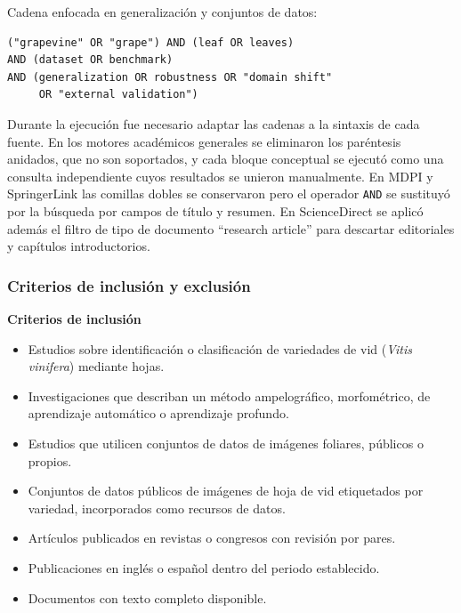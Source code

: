 Cadena enfocada en generalización y conjuntos de datos:
\begin{verbatim}
("grapevine" OR "grape") AND (leaf OR leaves)
AND (dataset OR benchmark)
AND (generalization OR robustness OR "domain shift"
     OR "external validation")
\end{verbatim}

Durante la ejecución fue necesario adaptar las cadenas a la sintaxis de cada
fuente. En los motores académicos generales se eliminaron los paréntesis
anidados, que no son soportados, y cada bloque conceptual se ejecutó como una
consulta independiente cuyos resultados se unieron manualmente. En MDPI y
SpringerLink las comillas dobles se conservaron pero el operador \texttt{AND}
se sustituyó por la búsqueda por campos de título y resumen. En ScienceDirect
se aplicó además el filtro de tipo de documento ``research article'' para
descartar editoriales y capítulos introductorios.

\subsubsection{Criterios de inclusión y exclusión}

\textbf{Criterios de inclusión}
\begin{itemize}
    \item Estudios sobre identificación o clasificación de variedades de vid
    (\textit{Vitis vinifera}) mediante hojas.
    \item Investigaciones que describan un método ampelográfico, morfométrico,
    de aprendizaje automático o aprendizaje profundo.
    \item Estudios que utilicen conjuntos de datos de imágenes foliares,
    públicos o propios.
    \item Conjuntos de datos públicos de imágenes de hoja de vid etiquetados
    por variedad, incorporados como recursos de datos.
    \item Artículos publicados en revistas o congresos con revisión por pares.
    \item Publicaciones en inglés o español dentro del periodo establecido.
    \item Documentos con texto completo disponible.
\end{itemize}

